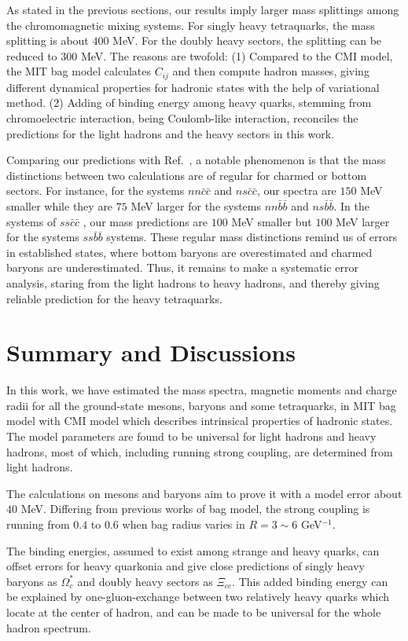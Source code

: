 \documentclass[prd,twocolumn,floatfix,nofootinbib]{revtex4}
\begin{document}
As stated in the previous sections, our results imply larger mass splittings among the chromomagnetic mixing systems. For singly heavy tetraquarks, the mass splitting is about $400$ MeV. For the doubly heavy sectors, the splitting can be reduced to $300$ MeV. 
The reasons are twofold: 
(1) Compared to the CMI model, the MIT bag model calculates $C_{ij}$ and then compute hadron masses, giving different dynamical properties for hadronic states with the help of variational method. 
(2) Adding of binding energy among heavy quarks, stemming from chromoelectric interaction, being Coulomb-like interaction, reconciles the predictions for the light hadrons and the heavy sectors in this work. 

Comparing our predictions with Ref.~\cite{Lu:2020rog}, a notable phenomenon is that the mass distinctions between two calculations are of regular for charmed or bottom sectors. 
For instance, for the systems $nn\bar{c}\bar{c}$ and $ns\bar{c}\bar{c}$, our spectra are $150$ MeV smaller while they are $75$ MeV larger for the systems $nn\bar{b}\bar{b}$ and $ns\bar{b}\bar{b}$. 
In the systems of $ss\bar{c}\bar{c}$ , our mass predictions are $100$ MeV smaller but $100$ MeV larger for the systems $ss\bar{b}\bar{b}$ systems. 
These regular mass distinctions remind us of errors in established states, where bottom baryons are overestimated and charmed baryons are underestimated. 
Thus, it remains to make a systematic error analysis, staring from the light hadrons to heavy hadrons, and thereby giving reliable prediction for the heavy tetraquarks.


\section{Summary and Discussions}\label{Discussions}
In this work, we have estimated the mass spectra, magnetic moments and charge radii for all the ground-state mesons, baryons and some tetraquarks, in MIT bag model with CMI model which describes intrinsical properties of hadronic states. 
The model parameters are found to be universal for light hadrons and heavy hadrons, most of which, including running strong coupling, are determined from light hadrons.

The calculations on mesons and baryons aim to prove it with a model error about $40$ MeV. Differing from previous works of bag model, the strong coupling is running from $0.4$ to $0.6$ when bag radius varies in $R=3\sim 6$ GeV$^{-1}$.

The binding energies, assumed to exist among strange and heavy quarks, can offset errors for heavy quarkonia and give close predictions of singly heavy baryons as $\Omega_{c}^{\ast}$ and doubly heavy sectors as $\Xi_{cc}$. 
This added binding energy can be explained by one-gluon-exchange between two relatively heavy quarks which locate at the center of hadron, and can be made to be universal for the whole hadron spectrum. 
\end{document}
